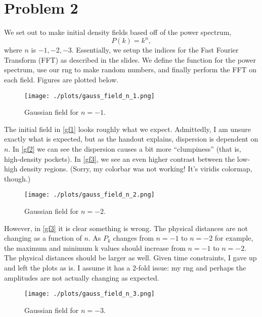 \section{Problem 2}


We set out to make initial density fields based off of the power spectrum,
\begin{equation}
  P(k) = k^n,
\end{equation}
where $n$ is $-1, -2, -3$. Essentially, we setup the indices for the Fast
Fourier Transform (FFT) as described in the slides. We define the function
for the power spectrum, use our rng to make random numbers, and finally
perform the FFT on each field. Figures are plotted below.

\begin{figure}[h!]
    \centering
    \texttt{[image: ./plots/gauss\_field\_n\_1.png]}
    \caption{Gaussian field for $n=-1$.}
    \label{gf1}
\end{figure}
The initial field in \autoref{gf1} looks roughly what we expect.
Admittedly, I am unsure exactly what is expected, but as the handout
explains, dispersion is dependent on $n$. In \autoref{gf2} we can see
the dispersion causes a bit more ``clumpiness'' (that is, high-density
pockets). In \autoref{gf3}, we see an even higher contrast between
the low-high density regions. (Sorry, my colorbar was not working! It's 
viridis colormap, though.)
\begin{figure}[h!]
    \centering
    \texttt{[image: ./plots/gauss\_field\_n\_2.png]}
    \caption{Gaussian field for $n=-2$.}
    \label{gf2}
\end{figure}
However, in \autoref{gf3} it is clear something is wrong. The physical
distances are not changing as a function of $n$. As $P_k$ changes from
$n=-1$ to $n=-2$ for example, the maximum and minimum k values should increase
from $n=-1$ to $n=-2$. The physical distances should be larger as well.
Given time constraints, I gave up and left the plots as is. I assume 
it has a $2$-fold issue: my rng and perhaps the amplitudes are not actually
changing as expected.
\begin{figure}[h!]
    \centering
    \texttt{[image: ./plots/gauss\_field\_n\_3.png]}
    \caption{Gaussian field for $n=-3$.}
    \label{gf3}
\end{figure}

